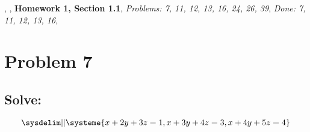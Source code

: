 \documentclass{article}
\begin{document}

\large{},
\large{},
\large\textbf{Homework 1, Section 1.1},
\large\textit{Problems: 7, 11, 12, 13, 16, 24, 26, 39},
\large\textit{Done: 7, 11, 12, 13, 16},

\section*{Problem 7}
\subsection*{Solve: }
$$
\sysdelim||\systeme{
    x + 2y + 3z = 1,
    x + 3y + 4z = 3,
    x + 4y + 5z = 4
}
$$
\end{document}
